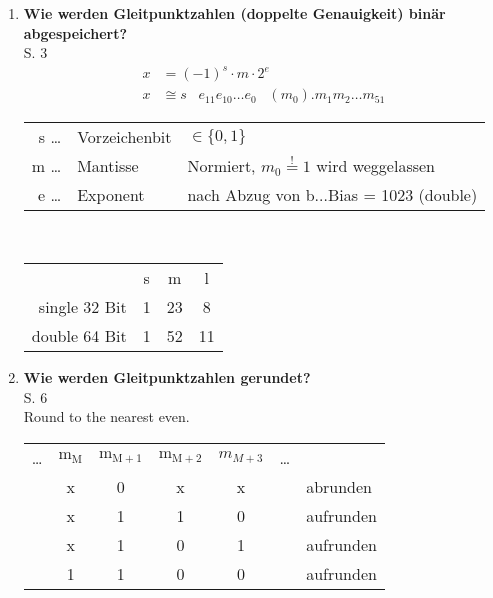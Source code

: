 \begin{enumerate}
			
		\item \textbf{Wie werden Gleitpunktzahlen (doppelte Genauigkeit) binär abgespeichert?}\\
		S. 3
			\begin{align*}
				x &= (-1)^s \cdot m \cdot 2^e \\
				x &\cong s \;\;\; e_{11}e_{10}\dots e_0 \;\;\; (m_0).m_1m_2\dots m_{51}
			\end{align*}\vspace{-0.5cm}
			\begin{table}[htbp]
				\centering
				\begin{tabular}[htpb]{rll}
					s \; \dots \!\!\! & Vorzeichenbit &\(\in \{0,1\}\)\\
					m \; \dots \!\!\! & Mantisse & Normiert, \(m_0\overset{!}{=}1\) wird weggelassen\\
					e \; \dots \!\!\! & Exponent & nach Abzug von b\(\dots\)Bias = 1023 (double)
				\end{tabular} \\ \vspace{0.3cm}
				\begin{tabular}[htpb]{rccc}
					 & s & m & l \\
					  single 32 Bit & 1 & 23 & 8 \\
					  double 64 Bit & 1 & 52 & 11
				\end{tabular}
			\end{table}
		\item \textbf{Wie werden Gleitpunktzahlen gerundet?} \\
		S. 6 \\
		Round to the nearest even.
		\begin{table}[htbp]
			\centering
			\begin{tabular}[htpb]{ccccccl}
				\dots & \(\text{m}_\text{M}\) & \(\text{m}_{\text{M}+1}\) & \(\text{m}_{\text{M}+2}\) & \(m_{M+3}\) & \dots &  \\
				      & x                   & 0                       & x                       & x         &       & abrunden  \\
				      & x                   & 1                       & 1                       & 0         &       & aufrunden \\
				      & x                   & 1                       & 0                       & 1         &       & aufrunden \\
				      & 1                   & 1                       & 0                       & 0         &       & aufrunden \\

\end{tabular}
\end{table}
\end{enumerate}
